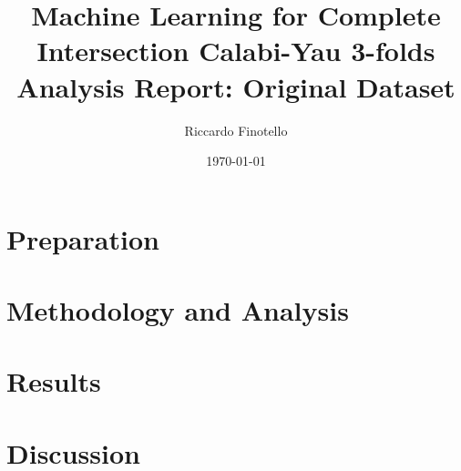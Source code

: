 \documentclass[10pt,a4paper]{article}
\author{Riccardo Finotello}
\title{
    Machine Learning for Complete Intersection Calabi-Yau 3-folds
    \\[0.3cm]
    \Large{\textbf{Analysis Report: Original Dataset}}
}
\date{\today}
\numberwithin{equation}{section}
\numberwithin{figure}{section}
\numberwithin{table}{section}
\begin{document}
    \maketitle
    
    \begin{abstract}
        
    \end{abstract}
    
    \clearpage
    \tableofcontents
    
    \clearpage
    \section{Preparation}
        
    
    \section{Methodology and Analysis}
        
    
    \section{Results}
        
        
    \section{Discussion}
        
    
    \clearpage
    
    
\end{document}
